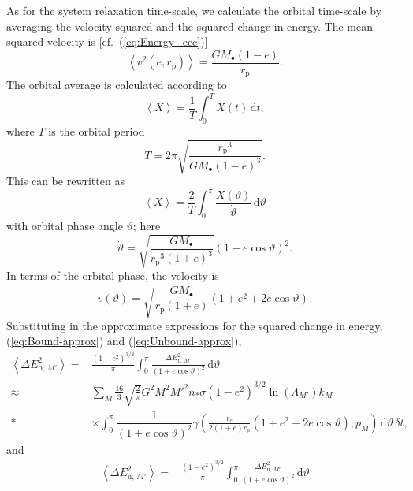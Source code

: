 \documentclass[useAMS,usedcolumn,usegraphicx,usenatbib]{mn2e}
\newcommand{\eqnref}[1]{(\ref{eq:#1})}
\newcommand{\sub}[1]{\ensuremath{_\mathrm{#1}}}
\newcommand{\dd}{\ensuremath{\mathrm{d}}}
\newcommand{\intd}[4]{\ensuremath{\displaystyle \int_{#1}^{#2}{#3}\,\dd{#4}}}
\newcommand{\recip}[1]{\ensuremath{\dfrac{1}{#1}}}
\begin{document}
\begin{onecolumn}
As for the system relaxation time-scale, we calculate the orbital time-scale by averaging the velocity squared and the squared change in energy. The mean squared velocity is [cf.\ \eqnref{Energy_ecc}]
\begin{equation}
\left\langle v^2\left(e,r\sub{p}\right)\right\rangle = \frac{GM_\bullet(1 - e)}{r\sub{p}}.
\end{equation}
The orbital average is calculated according to~\citep[section 2.2b]{Spitzer1987}
\begin{equation}
\left\langle X\right\rangle = \recip{T}\intd{0}{T}{X(t)}{t},
\end{equation}
where $T$ is the orbital period
\begin{equation}
T = 2\pi\sqrt{\frac{r\sub{p}^3}{GM_\bullet(1-e)^{3}}}.
\end{equation}
 This can be rewritten as
\begin{equation}
\left\langle X\right\rangle = \frac{2}{T}\intd{0}{\pi}{\frac{X(\vartheta)}{\dot{\vartheta}}}{\vartheta}
\end{equation}
with orbital phase angle $\vartheta$; here
\begin{equation}
\dot{\vartheta} = \sqrt{\frac{GM_\bullet}{r\sub{p}^3(1+e)^3}}(1 + e \cos\vartheta)^2.
\end{equation}
In terms of the orbital phase, the velocity is
\begin{equation}
v(\vartheta) = \sqrt{\frac{GM_\bullet}{r\sub{p}(1+e)}\left(1 + e^2 + 2e\cos\vartheta\right)}.
\end{equation}
Substituting in the approximate expressions for the squared change in energy, \eqnref{Bound-approx} and \eqnref{Unbound-approx},
\begin{align}
\left\langle\Delta E^2_{\mathrm{b},\,M'}\right\rangle = {} & \frac{\left(1-e^2\right)^{3/2}}{\pi}\intd{0}{\pi}{\frac{\Delta E^2_{\mathrm{b},\,M'}}{(1 + e \cos\vartheta)^2}}{\vartheta} \\
 \approx {} & \sum_M \frac{16}{3}\sqrt{\frac{2}{\pi}}G^2 M^2{M'}^2n_\ast\sigma\left(1-e^2\right)^{3/2}\ln\left(\Lambda_{M'}\right)k_M \nonumber \\*
 & \times {} \intd{0}{\pi}{\recip{(1 + e \cos\vartheta)^2} \gamma\left(\frac{r\sub{c}}{2(1+e)r\sub{p}}\left(1+e^2+2e\cos\vartheta\right);p_M\right)}{\vartheta}\,\delta t,
\end{align}
and
\begin{align}
\left\langle\Delta E^2_{\mathrm{u},\,M'}\right\rangle = {} & \frac{\left(1-e^2\right)^{3/2}}{\pi}\intd{0}{\pi}{\frac{\Delta E^2_{\mathrm{u},\,M'}}{(1 + e \cos\vartheta)^2}}{\vartheta} \\

\end{align}
\end{onecolumn}
\end{document}
